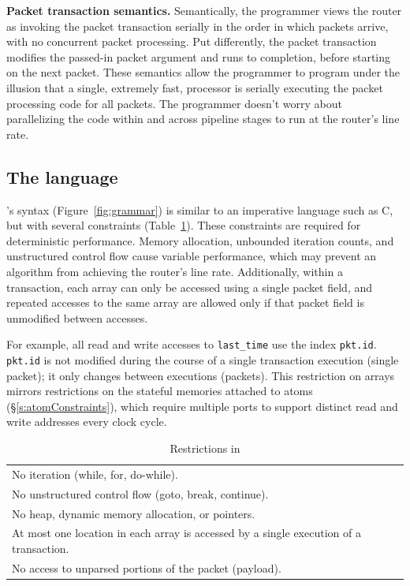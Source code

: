 \medskip
\noindent
\textbf{Packet transaction semantics.}
Semantically, the programmer views the router as invoking the packet
transaction serially in the order in which packets arrive, with no concurrent
packet processing.  Put differently, the packet transaction modifies the
passed-in packet argument and runs to completion, before starting on the next
packet.  These semantics allow the programmer to program under the illusion
that a single, extremely fast, processor is serially executing the packet
processing code for all packets. The programmer doesn't worry about
parallelizing the code within and across pipeline stages to run at the router's
line rate.

\subsection{The \pktlanguage language}
\label{ss:constraints}
\pktlanguage's syntax (Figure~\ref{fig:grammar}) is similar to an imperative
language such as C, but with several constraints (Table~\ref{tab:restrict}).
These constraints are required for deterministic performance.  Memory
allocation, unbounded iteration counts, and unstructured control flow cause
variable performance, which may prevent an algorithm from achieving the
router's line rate.  Additionally, within a \pktlanguage transaction, each
array can only be accessed using a single packet field, and repeated accesses
to the same array are allowed only if that packet field is unmodified between
accesses.

For example, all read and write accesses to \texttt{last\_time} use the index
\texttt{pkt.id}. \texttt{pkt.id} is not modified during the course of a single
transaction execution (single packet); it only changes between executions
(packets).  This restriction on arrays mirrors restrictions on the stateful
memories attached to atoms (\S\ref{s:atomConstraints}), which require multiple
ports to support distinct read and write addresses every clock cycle.

\begin{table}
  \begin{tabular}{p{}}
   No iteration (while, for, do-while).\\
   No unstructured control flow (goto, break, continue).\\
   No heap, dynamic memory allocation, or pointers.\\
   At most one location in each array is accessed by a single execution of a transaction. \\
   No access to unparsed portions of the packet (payload).\\
  \end{tabular}
  \caption{Restrictions in \pktlanguage}
  \label{tab:restrict}
\end{table}

